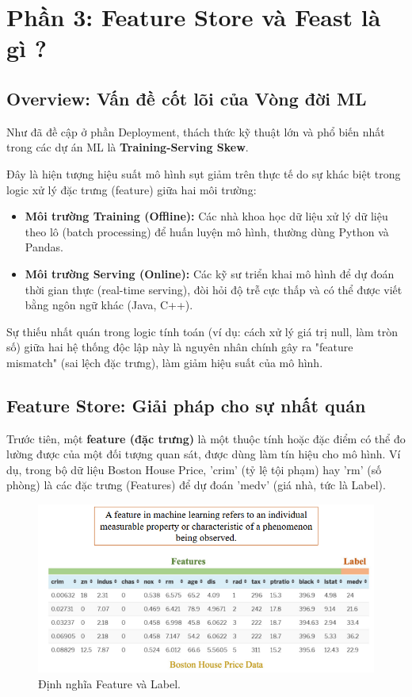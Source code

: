 \documentclass[11pt]{article}
\begin{document}
\section{Phần 3: Feature Store và Feast là gì ?}

\subsection{Overview: Vấn đề cốt lõi của Vòng đời ML}
Như đã đề cập ở phần Deployment, thách thức kỹ thuật lớn và phổ biến nhất trong các dự án ML là \textbf{Training-Serving Skew}.

Đây là hiện tượng hiệu suất mô hình sụt giảm trên thực tế do sự khác biệt trong logic xử lý đặc trưng (feature) giữa hai môi trường:
\begin{itemize}
	\item \textbf{Môi trường Training (Offline):} Các nhà khoa học dữ liệu xử lý dữ liệu theo lô (batch processing) để huấn luyện mô hình, thường dùng Python và Pandas.
	\item \textbf{Môi trường Serving (Online):} Các kỹ sư triển khai mô hình để dự đoán thời gian thực (real-time serving), đòi hỏi độ trễ cực thấp và có thể được viết bằng ngôn ngữ khác (Java, C++).
\end{itemize}

Sự thiếu nhất quán trong logic tính toán (ví dụ: cách xử lý giá trị null, làm tròn số) giữa hai hệ thống độc lập này là nguyên nhân chính gây ra "feature mismatch" (sai lệch đặc trưng), làm giảm hiệu suất của mô hình.

\subsection{Feature Store: Giải pháp cho sự nhất quán}

Trước tiên, một \textbf{feature (đặc trưng)} là một thuộc tính hoặc đặc điểm có thể đo lường được của một đối tượng quan sát, được dùng làm tín hiệu cho mô hình. Ví dụ, trong bộ dữ liệu Boston House Price, 'crim' (tỷ lệ tội phạm) hay 'rm' (số phòng) là các đặc trưng (Features) để dự đoán 'medv' (giá nhà, tức là Label).

\begin{figure}[H]
    \centering
    \includegraphics[width=0.8\linewidth]{images/whatfeasture.png}
    \caption{Định nghĩa Feature và Label.}
\end{figure}
\end{document}
